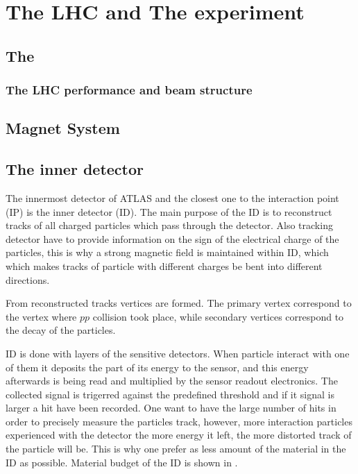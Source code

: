 \chapter{The LHC and The \ATLAS experiment}
\label{chap:MoreStuff}



\section{The \LHC}
\subsection{The LHC performance and beam structure}




\section{Magnet System}
\section{The inner detector}
\label{sec:ID}

The innermost detector of ATLAS and the closest one to the interaction point (IP) is the inner detector (ID).
The main purpose of the ID is to reconstruct tracks of all charged particles which pass through the detector.
Also tracking detector have to provide information on the sign of the electrical charge of the particles, 
this is why a strong magnetic field is maintained within ID, which 
which makes tracks of particle with different charges be bent into different directions.

From reconstructed tracks vertices are formed. The primary vertex correspond to the vertex where $pp$ collision took place, 
while secondary vertices correspond to the decay of the particles.

ID is done with layers of the sensitive detectors. When particle interact with one of them it deposits the part of its energy to the sensor,
and this energy afterwards is being read and multiplied by the sensor readout electronics. The collected signal is trigerred against the predefined threshold and if 
it signal is larger a hit have been recorded.
One want to have the large number of hits in order to precisely measure the particles track, however, more interaction particles experienced with the detector the more
energy it left, the more distorted track of the particle will be. This is why one prefer as less amount of the material in the ID as possible.
Material  budget of the ID is shown in .

